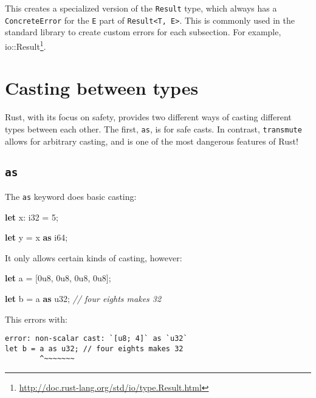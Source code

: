 \documentclass[a4paper,]{book}
\newenvironment{Shaded}{\begin{snugshade}}{\end{snugshade}}
\newcommand{\KeywordTok}[1]{\textcolor[rgb]{0.13,0.29,0.53}{\textbf{{#1}}}}
\newcommand{\DataTypeTok}[1]{\textcolor[rgb]{0.13,0.29,0.53}{{#1}}}
\newcommand{\DecValTok}[1]{\textcolor[rgb]{0.00,0.00,0.81}{{#1}}}
\newcommand{\CommentTok}[1]{\textcolor[rgb]{0.56,0.35,0.01}{\textit{{#1}}}}
\newcommand{\NormalTok}[1]{{#1}}
\renewcommand{\href}[2]{#2\footnote{\url{#1}}}
\begin{document}
This creates a specialized version of the \texttt{Result} type, which
always has a \texttt{ConcreteError} for the \texttt{E} part of
\texttt{Result\textless{}T,\ E\textgreater{}}. This is commonly used in
the standard library to create custom errors for each subsection. For
example,
\href{http://doc.rust-lang.org/std/io/type.Result.html}{io::Result}.

\section{Casting between types}\label{sec--casting-between-types}

Rust, with its focus on safety, provides two different ways of casting
different types between each other. The first, \texttt{as}, is for safe
casts. In contrast, \texttt{transmute} allows for arbitrary casting, and
is one of the most dangerous features of Rust!

\subsection{\texorpdfstring{\texttt{as}}{as}}\label{as}

The \texttt{as} keyword does basic casting:

\begin{Shaded}
\begin{Highlighting}[]
\KeywordTok{let} \NormalTok{x: }\DataTypeTok{i32} \NormalTok{= }\DecValTok{5}\NormalTok{;}

\KeywordTok{let} \NormalTok{y = x }\KeywordTok{as} \DataTypeTok{i64}\NormalTok{;}
\end{Highlighting}
\end{Shaded}

It only allows certain kinds of casting, however:

\begin{Shaded}
\begin{Highlighting}[]
\KeywordTok{let} \NormalTok{a = [}\DecValTok{0u8}\NormalTok{, }\DecValTok{0u8}\NormalTok{, }\DecValTok{0u8}\NormalTok{, }\DecValTok{0u8}\NormalTok{];}

\KeywordTok{let} \NormalTok{b = a }\KeywordTok{as} \DataTypeTok{u32}\NormalTok{; }\CommentTok{// four eights makes 32}
\end{Highlighting}
\end{Shaded}

This errors with:

\begin{verbatim}
error: non-scalar cast: `[u8; 4]` as `u32`
let b = a as u32; // four eights makes 32
        ^~~~~~~~
\end{verbatim}
\end{document}
